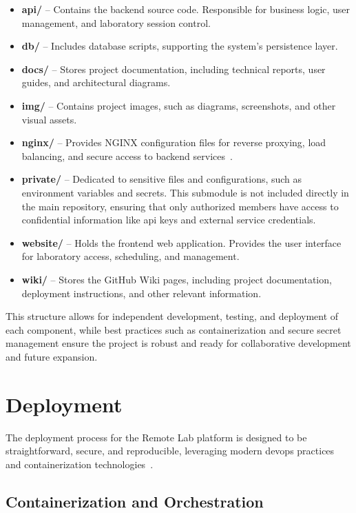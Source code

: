 \begin{itemize}
    \item \textbf{api/} – Contains the backend source code. Responsible for business logic, user management, and laboratory session control.
    \item \textbf{db/} – Includes database scripts, supporting the system's persistence layer.
    \item \textbf{docs/} – Stores project documentation, including technical reports, user guides, and architectural diagrams.
    \item \textbf{img/} – Contains project images, such as diagrams, screenshots, and other visual assets.
    \item \textbf{nginx/} – Provides NGINX configuration files for reverse proxying, load balancing, and secure access to backend services~\cite{nginx-docs}.
    \item \textbf{private/} – Dedicated to sensitive files and configurations, such as environment variables and secrets. This submodule is not included directly in the main repository, ensuring that only authorized members have access to confidential information like \ac{api} keys and external service credentials.
    \item \textbf{website/} – Holds the frontend web application. Provides the user interface for laboratory access, scheduling, and management.
    \item \textbf{wiki/} – Stores the GitHub Wiki pages, including project documentation, deployment instructions, and other relevant information.
\end{itemize}

This structure allows for independent development, testing, and deployment of each component, while best practices such as containerization and secure secret management ensure the project is robust and ready for collaborative development and future expansion.

\section{Deployment} \label{sec:deployment}

The deployment process for the Remote Lab platform is designed to be straightforward, secure, and reproducible, leveraging modern \ac{devops} practices and containerization technologies~\cite{docker-docs,docker-compose-docs}.

\subsection{Containerization and Orchestration} \label{subsec:containerization}

